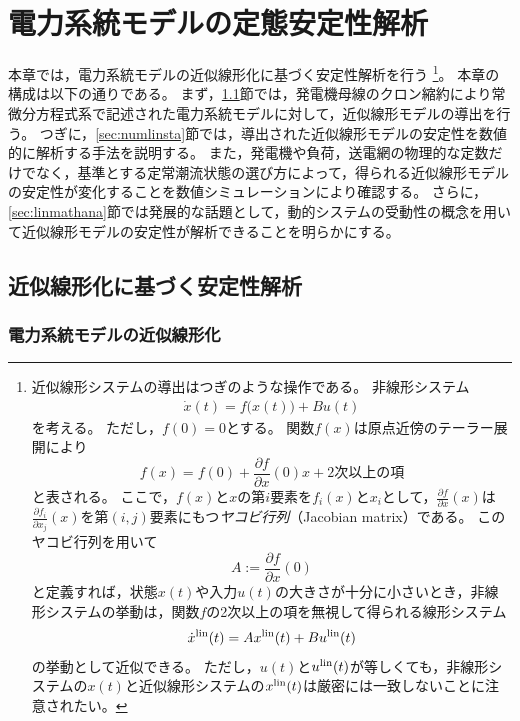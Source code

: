 \documentclass[tombow,dvipdfmx]{corona-a5-1.1}
\begin{document}
\chapter{電力系統モデルの定態安定性解析}\label{sec:staana}

本章では，電力系統モデルの近似線形化に基づく安定性解析を行う
\footnote{
近似線形システムの導出はつぎのような操作である。
非線形システム
\begin{align*}
\dot{x}(t) = f\bigl(x(t)\bigr) + Bu(t) 
\end{align*}
を考える。
ただし，$f(0)=0$とする。
関数$f(x)$は原点近傍のテーラー展開により
\[
f(x)=f(0) + \frac{\partial f}{\partial x} (0) x + \mbox{2次以上の項}
\]
と表される。
ここで，$f(x)$と$x$の第$i$要素を$f_i(x)$と$x_i$として，$\tfrac{\partial f}{\partial x}(x)$は$\tfrac{\partial f_i}{\partial x_j}(x)$を第$(i,j)$要素にもつ\emph{ヤコビ行列}（Jacobian matrix）である。
このヤコビ行列を用いて
\[
A:=\frac{\partial f}{\partial x} (0)
\]
と定義すれば，状態$x(t)$や入力$u(t)$の大きさが十分に小さいとき，非線形システムの挙動は，関数$f$の2次以上の項を無視して得られる線形システム
\begin{align*}
\dot{x}^{\rm lin}(t) = Ax^{\rm lin}(t) + Bu^{\rm lin}(t) 
\end{align*}
の挙動として近似できる。 
ただし，$u(t)$と$u^{\rm lin}(t)$が等しくても，非線形システムの$x(t)$と近似線形システムの$x^{\rm lin}(t)$は厳密には一致しないことに注意されたい。
}。
本章の構成は以下の通りである。
まず，\ref{sec:stalin}節では，発電機母線のクロン縮約により常微分方程式系で記述された電力系統モデルに対して，近似線形モデルの導出を行う。
つぎに，\ref{sec:numlinsta}節では，導出された近似線形モデルの安定性を数値的に解析する手法を説明する。
また，発電機や負荷，送電網の物理的な定数だけでなく，基準とする定常潮流状態の選び方によって，得られる近似線形モデルの安定性が変化することを数値シミュレーションにより確認する。
さらに，\ref{sec:linmathana}節では発展的な話題として，動的システムの受動性の概念を用いて近似線形モデルの安定性が解析できることを明らかにする。



\section{近似線形化に基づく安定性解析}\label{sec:stalin}

\subsection{電力系統モデルの近似線形化}\label{sec:linaproxt}
\end{document}
